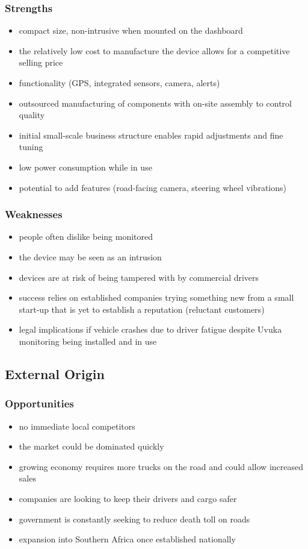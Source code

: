\subsubsection{Strengths}
\vskip8pt
\begin{itemize}
\item compact size, non-intrusive when mounted on the dashboard
\item the relatively low cost to manufacture the device allows for a competitive selling price
\item functionality (GPS, integrated sensors, camera, alerts)
\item outsourced manufacturing of components with on-site assembly to control quality
\item initial small-scale business structure enables rapid adjustments and fine tuning
\item low power consumption while in use
\item potential to add features (road-facing camera, steering wheel vibrations)
\end{itemize}
\vskip15pt
\subsubsection{Weaknesses}
\vskip8pt
\begin{itemize}
\item people often dislike being monitored
\item the device may be seen as an intrusion
\item devices are at risk of being tampered with by commercial drivers
\item success relies on established companies trying something new from a small start-up that is yet to establish a reputation (reluctant customers)
\item legal implications if vehicle crashes due to driver fatigue despite Uvuka monitoring being installed and in use
\end{itemize}
\vskip15pt
\subsection{External Origin}
\subsubsection{Opportunities}
\vskip8pt
\begin{itemize}
\item no immediate local competitors
\item the market could be dominated quickly
\item growing economy requires more trucks on the road and could allow increased sales
\item companies are looking to keep their drivers and cargo safer
\item government is constantly seeking to reduce death toll on roads
\item expansion into Southern Africa once established nationally
\end{itemize}

